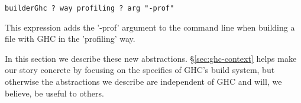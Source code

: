 \begin{lstlisting}
builderGhc ? way profiling ? arg "-prof"
\end{lstlisting}

\noindent This expression adds the \lst'-prof' argument to the command line when
building a file with GHC in the \lst'profiling' way.

In this section we describe these new abstractions. \S\ref{sec:ghc-context} helps
make our story concrete by focusing on the specifics of GHC's build system,
but otherwise the abstractions we describe are independent of GHC and will, we believe,
be useful to others.

\newcommand{\itab}[1]{\hspace{0em}\rlap{#1}}
\newcommand{\tab}[1]{\hspace{.1\textwidth}\rlap{#1}}
\newcommand{\ctab}[1]{\hspace{.031\textwidth}\rlap{#1}}
\newcommand{\ptab}[1]{\hspace{.074\textwidth}\rlap{#1}}
\newcommand{\cotab}[1]{\hspace{.064\textwidth}\rlap{#1}}
\newcommand{\ttab}[1]{\hspace{.058\textwidth}\rlap{#1}}
\newcommand{\tytab}[1]{\hspace{.083\textwidth}\rlap{#1}}
\newcommand{\atab}[1]{\hspace{.102\textwidth}\rlap{#1}}


